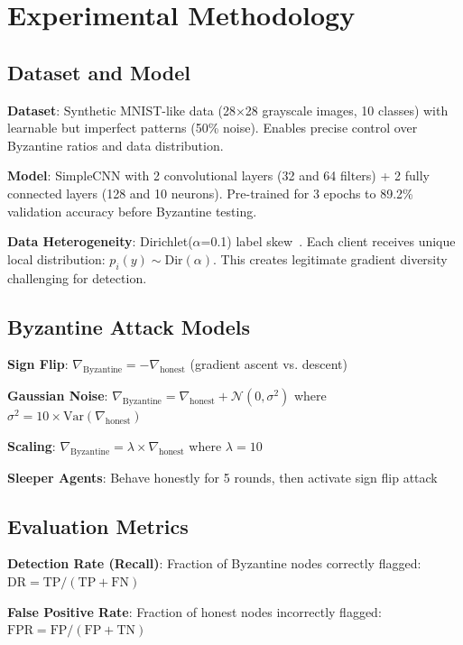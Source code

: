 \section{Experimental Methodology}
\label{sec:experiments}

\subsection{Dataset and Model}

\textbf{Dataset}: Synthetic MNIST-like data (28×28 grayscale images, 10 classes) with learnable but imperfect patterns (50\% noise). Enables precise control over Byzantine ratios and data distribution.

\textbf{Model}: SimpleCNN with 2 convolutional layers (32 and 64 filters) + 2 fully connected layers (128 and 10 neurons). Pre-trained for 3 epochs to 89.2\% validation accuracy before Byzantine testing.

\textbf{Data Heterogeneity}: Dirichlet($\alpha$=0.1) label skew~\cite{hsu2019measuring}. Each client receives unique local distribution: $p_i(y) \sim \text{Dir}(\alpha)$. This creates legitimate gradient diversity challenging for detection.

\subsection{Byzantine Attack Models}

\textbf{Sign Flip}: $\nabla_{\text{Byzantine}} = -\nabla_{\text{honest}}$ (gradient ascent vs. descent)

\textbf{Gaussian Noise}: $\nabla_{\text{Byzantine}} = \nabla_{\text{honest}} + \mathcal{N}(0, \sigma^2)$ where $\sigma^2 = 10 \times \text{Var}(\nabla_{\text{honest}})$

\textbf{Scaling}: $\nabla_{\text{Byzantine}} = \lambda \times \nabla_{\text{honest}}$ where $\lambda = 10$

\textbf{Sleeper Agents}: Behave honestly for 5 rounds, then activate sign flip attack

\subsection{Evaluation Metrics}

\textbf{Detection Rate (Recall)}: Fraction of Byzantine nodes correctly flagged: $\text{DR} = \text{TP} / (\text{TP} + \text{FN})$

\textbf{False Positive Rate}: Fraction of honest nodes incorrectly flagged: $\text{FPR} = \text{FP} / (\text{FP} + \text{TN})$


